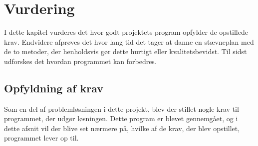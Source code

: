 \chapter{Vurdering}\label{ch:vurdering}
I dette kapitel vurderes det hvor godt projektets program opfylder de opstillede krav. Endvidere afprøves det hvor lang tid det tager at danne en stævneplan med de to metoder, der henholdsvis gør dette hurtigt eller kvalitetsbevidst. Til sidst udforskes det hvordan programmet kan forbedres.

\section{Opfyldning af krav}
Som en del af problemløsningen i dette projekt, blev der stillet nogle krav til programmet, der udgør løsningen. Dette program er blevet gennemgået, og i dette afsnit vil der blive set nærmere på, hvilke af de krav, der blev opstillet, programmet lever op til.

